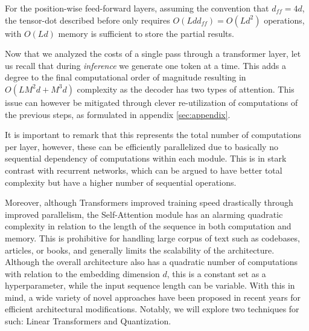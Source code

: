For the position-wise feed-forward layers, assuming the convention that $d_{ff} = 4d$, the tensor-dot described before only requires $O(Ldd_{ff}) = O(Ld^2)$ operations, with $O(Ld)$ memory is sufficient to store the partial results.



\vspace{0.5em}

Now that we analyzed the costs of a single pass through a transformer layer, let us recall that during \textit{inference} we generate one token at a time. This adds a degree to the final computational order of magnitude resulting in $O(LM^2d + M^3d)$ complexity as the decoder has two types of attention. This issue can however be mitigated through clever re-utilization of computations of the previous steps, as formulated in   appendix \ref{sec:appendix}.

\vspace{0.5em}

It is important to remark that this represents the total number of computations per layer, however, these can be efficiently parallelized due to basically no sequential dependency of computations within each module. This is in stark contrast with recurrent networks, which can be argued to have better total complexity but have a higher number of sequential operations.

Moreover, although Transformers improved training speed drastically through improved parallelism, the Self-Attention module has an alarming quadratic complexity in relation to the length of the sequence in both computation and memory.  This is prohibitive for handling large corpus of text such as codebases, articles, or books, and generally limits the scalability of the architecture. Although the overall architecture also has a quadratic number of computations with relation to the embedding dimension $d$, this is a constant set as a hyperparameter, while the input sequence length can be variable. With this in mind, a wide variety of novel approaches have been proposed in recent years for efficient architectural modifications. Notably, we will explore two techniques for such: Linear Transformers and Quantization.